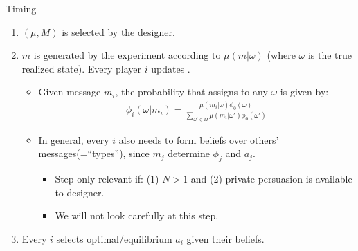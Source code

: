 \documentclass[english,10pt
,aspectratio=169
]{beamer}
\begin{document}
\begin{frame}{Timing}
	\begin{enumerate}
		\item {} $(\mu,M)$ is selected by the designer.
		\item {} $m$ is generated by the experiment according to $\mu(m|\omega)$ (where $\omega$ is the true realized state). Every player $i$ updates .
		\begin{itemize}
			\item Given message $m_i$, the probability that  assigns to any $\omega$ is given by:
			\begin{align*}
				\phi_i(\omega|m_i) = \frac{\mu(m_i|\omega)\phi_0(\omega)}{\sum_{\omega' \in \Omega} \mu(m_i|\omega')\phi_0(\omega')}
			\end{align*}
			
			\item In general, every $i$ also needs to form beliefs over others' messages(=``types''), since $m_j$ determine $\phi_j$ and $a_j$.
			\begin{itemize}
				\item Step only relevant if: (1) $N>1$ and (2) private persuasion is available to designer.
				\item We will not look carefully at this step.
			\end{itemize}
		\end{itemize}
		\item Every $i$ selects optimal/equilibrium  $\hat{a}_i$ given their beliefs.
	\end{enumerate}
\end{frame}
\end{document}
